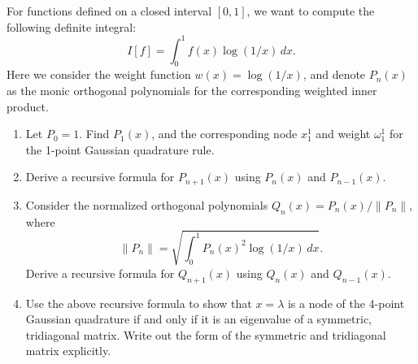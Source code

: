\begin{exercise}
\label{applied:2023:2}
For functions defined on a closed interval $[0, 1]$, we want to compute the following definite integral:
\[
    I[f] = \int_{0}^{1} f(x) \log(1/x) \, dx.
\]
Here we consider the weight function $w(x) = \log(1/x)$, and denote $P_n(x)$ as the monic orthogonal polynomials for the corresponding weighted inner product.

\begin{enumerate}[label=(\alph*)]
    \item Let $P_0 = 1$. Find $P_1(x)$, and the corresponding node $x_1^1$ and weight $\omega_1^1$ for the 1-point Gaussian quadrature rule.
    \item Derive a recursive formula for $P_{n+1}(x)$ using $P_n(x)$ and $P_{n-1}(x)$.
    \item Consider the normalized orthogonal polynomials $Q_n(x) = P_n(x) / \|P_n\|$, where
    \[
        \|P_n\| = \sqrt{\int_0^1 P_n(x)^2 \log(1/x) \, dx}.
    \]
    Derive a recursive formula for $Q_{n+1}(x)$ using $Q_n(x)$ and $Q_{n-1}(x)$.
    \item Use the above recursive formula to show that $x = \lambda$ is a node of the 4-point Gaussian quadrature if and only if it is an eigenvalue of a symmetric, tridiagonal matrix. Write out the form of the symmetric and tridiagonal matrix explicitly.
\end{enumerate}
\end{exercise}


